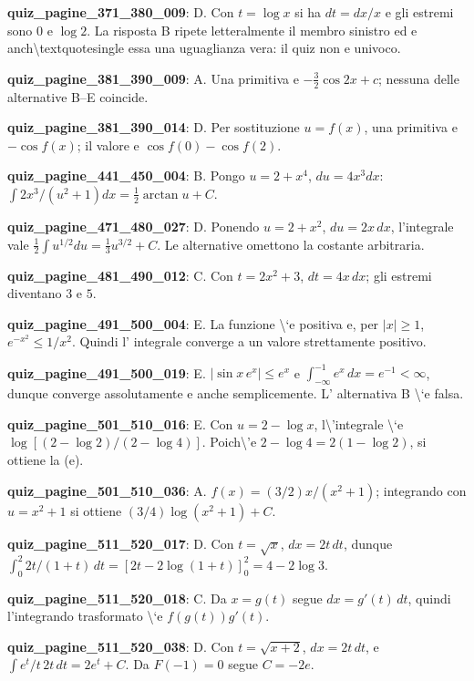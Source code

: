 \documentclass[11pt,a4paper]{article}
\newcounter{quiz}
\begin{document}
\noindent\textbf{quiz\_pagine\_371\_380\_009}: D. Con $t=\log x$ si ha $dt=dx/x$ e gli estremi sono $0$ e $\log2$. La risposta B ripete letteralmente il membro sinistro ed e anch\textbackslash{}textquotesingle essa una uguaglianza vera: il quiz non e univoco.\par\medskip
\noindent\textbf{quiz\_pagine\_381\_390\_009}: A. Una primitiva e $-\frac32\cos2x+c$; nessuna delle alternative B--E coincide.\par\medskip
\noindent\textbf{quiz\_pagine\_381\_390\_014}: D. Per sostituzione $u=f(x)$, una primitiva e $-\cos f(x)$; il valore e $\cos f(0)-\cos f(2)$.\par\medskip
\noindent\textbf{quiz\_pagine\_441\_450\_004}: B. Pongo $u=2+x^4$, $du=4x^3dx$: $\int 2x^3/(u^2+1)dx=\frac12\arctan u+C$.\par\medskip
\noindent\textbf{quiz\_pagine\_471\_480\_027}: D. Ponendo $u=2+x^2$, $du=2x\,dx$, l'integrale vale $\frac12\int u^{1/2}du=\frac13u^{3/2}+C$. Le alternative omettono la costante arbitraria.\par\medskip
\noindent\textbf{quiz\_pagine\_481\_490\_012}: C. Con $t=2x^2+3$, $dt=4x\,dx$; gli estremi diventano $3$ e $5$.\par\medskip
\noindent\textbf{quiz\_pagine\_491\_500\_004}: E. La funzione \textbackslash{}`e positiva e, per $|x|\ge1$, $e^{-x^2}\le1/x^2$. Quindi l' integrale converge a un valore strettamente positivo.\par\medskip
\noindent\textbf{quiz\_pagine\_491\_500\_019}: E. $|\sin x\,e^x|\le e^x$ e $\int_{-\infty}^{-1}e^x\,dx=e^{-1}<\infty$, dunque converge assolutamente e anche semplicemente. L' alternativa B \textbackslash{}`e falsa.\par\medskip
\noindent\textbf{quiz\_pagine\_501\_510\_016}: E. Con $u=2-\log x$, l\textbackslash{}'integrale \textbackslash{}`e $\log[(2-\log2)/(2-\log4)]$. Poich\textbackslash{}'e $2-\log4=2(1-\log2)$, si ottiene la (e).\par\medskip
\noindent\textbf{quiz\_pagine\_501\_510\_036}: A. $f(x)=(3/2)x/(x^2+1)$; integrando con $u=x^2+1$ si ottiene $(3/4)\log(x^2+1)+C$.\par\medskip
\noindent\textbf{quiz\_pagine\_511\_520\_017}: D. Con $t=\sqrt{x}$, $dx=2t\,dt$, dunque $\int_0^2 2t/(1+t)\,dt=[2t-2\log(1+t)]_0^2=4-2\log3$.\par\medskip
\noindent\textbf{quiz\_pagine\_511\_520\_018}: C. Da $x=g(t)$ segue $dx=g'(t)\,dt$, quindi l'integrando trasformato \textbackslash{}`e $f(g(t))g'(t)$.\par\medskip
\noindent\textbf{quiz\_pagine\_511\_520\_038}: D. Con $t=\sqrt{x+2}$, $dx=2t\,dt$, e $\int e^t/t\,2t\,dt=2e^t+C$. Da $F(-1)=0$ segue $C=-2e$.\par\medskip
\end{document}
